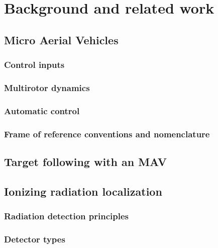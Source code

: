 \documentclass[a4paper,11pt,titlepage,twoside]{book}
\begin{document}



\chapter{Background and related work}


\section{Micro Aerial Vehicles}

\subsection{Control inputs}

\subsection{Multirotor dynamics}

\subsection{Automatic control}

\subsection{Frame of reference conventions and nomenclature}

\section{Target following with an MAV}

\section{Ionizing radiation localization}

\subsection{Radiation detection principles}

\subsection{Detector types}
\end{document}
